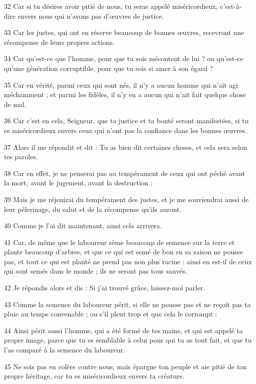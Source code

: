 \par 32 Car si tu désires avoir pitié de nous, tu seras appelé miséricordieux, c'est-à-dire envers nous qui n'avons pas d'œuvres de justice.
\par 33 Car les justes, qui ont en réserve beaucoup de bonnes œuvres, recevront une récompense de leurs propres actions.
\par 34 Car qu'est-ce que l'homme, pour que tu sois mécontent de lui ? ou qu'est-ce qu'une génération corruptible, pour que tu sois si amer à son égard ?
\par 35 Car en vérité, parmi ceux qui sont nés, il n'y a aucun homme qui n'ait agi méchamment ; et parmi les fidèles, il n’y en a aucun qui n’ait fait quelque chose de mal.
\par 36 Car c'est en cela, Seigneur, que ta justice et ta bonté seront manifestées, si tu es miséricordieux envers ceux qui n'ont pas la confiance dans les bonnes œuvres.
\par 37 Alors il me répondit et dit : Tu as bien dit certaines choses, et cela sera selon tes paroles.
\par 38 Car en effet, je ne penserai pas au tempérament de ceux qui ont péché avant la mort, avant le jugement, avant la destruction :
\par 39 Mais je me réjouirai du tempérament des justes, et je me souviendrai aussi de leur pèlerinage, du salut et de la récompense qu'ils auront.
\par 40 Comme je l'ai dit maintenant, ainsi cela arrivera.
\par 41 Car, de même que le laboureur sème beaucoup de semence sur la terre et plante beaucoup d'arbres, et que ce qui est semé de bon en sa saison ne pousse pas, et tout ce qui est planté ne prend pas non plus racine : ainsi en est-il de ceux qui sont semés dans le monde ; ils ne seront pas tous sauvés.
\par 42 Je répondis alors et dis : Si j'ai trouvé grâce, laissez-moi parler.
\par 43 Comme la semence du laboureur périt, si elle ne pousse pas et ne reçoit pas ta pluie au temps convenable ; ou s'il pleut trop et que cela le corrompt :
\par 44 Ainsi périt aussi l'homme, qui a été formé de tes mains, et qui est appelé ta propre image, parce que tu es semblable à celui pour qui tu as tout fait, et que tu l'as comparé à la semence du laboureur.
\par 45 Ne sois pas en colère contre nous, mais épargne ton peuple et aie pitié de ton propre héritage, car tu es miséricordieux envers ta créature.
